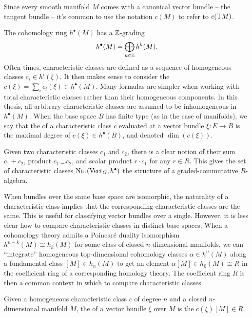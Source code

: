 \begin{convention*}
	Since every smooth manifold $M$ comes with a canonical vector bundle -- the tangent bundle -- it's common to use the notation $c(M)$ to refer to $c(\mathrm{T} M)$.
\end{convention*}

\begin{remark}
	The cohomology ring $h^\bullet(M)$ has a $\mathbb{Z}$-grading
	\[
		h^\bullet(M) = \bigoplus_{k\in \mathbb{Z}} h^k(M).
	\]
	Often times, characteristic classes are defined as a sequence of homogeneous classes $c_i\in h^{i}(\xi)$. It then makes sense to consider the  $c(\xi)=\sum_i c_i(\xi)\in h^\bullet(M)$. Many formulas are simpler when working with total characteristic classes rather than their homogeneous components. In this thesis, all arbitrary characteristic classes are assumed to be inhomogeneous in $h^\bullet(M)$. When the base space $B$ has finite type (as in the case of manifolds), we say that the  of a characteristic class $c$ evaluated at a vector bundle $\xi : E \to B$ is the maximal degree of $c(\xi)\in h^\bullet(B)$, and denoted $\dim(c(\xi))$.
\end{remark}

\begin{remark}
	Given two characteristic classes $c_1$ and $c_2$, there is a clear notion of their sum $c_1+c_2$, product $c_1\smile c_2$, and scalar product $r\cdot c_1$ for any $r\in R$. This gives the set of characteristic classes $\operatorname{Nat}(\operatorname{Vect}_G, h^\bullet)$ the structure of a graded-commutative $R$-algebra.
\end{remark}

When bundles over the same base space are isomorphic, the naturality of a characteristic class implies that the corresponding characteristic classes are the same. This is useful for classifying vector bundles over a single. However, it is less clear how to compare characteristic classes in distinct base spaces.
When a cohomology theory admits a Poincar\'e duality isomorphism $h^{n-k}(M) \cong h_k(M)$ for some class of closed $n$-dimensional manifolds, we can ``integrate'' homogeneous top-dimensional cohomology classes $\alpha\in h^{n}(M)$ along a fundamental class $[M]\in h_n(M)$ to get an element $\alpha[M]\in h_0(M)\cong R$ in the coefficient ring of a corresponding homology theory. The coefficient ring $R$ is then a common context in which to compare characteristic classes.

\begin{definition}\label{defn:characteristic-numbers}
	Given a homogeneous characteristic class $c$ of degree $n$ and a closed $n$-dimensional manifold $M$, the  of a vector bundle $\xi$ over $M$ is the $c(\xi)[M] \in R$.
\end{definition}

